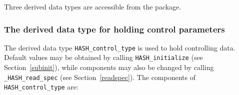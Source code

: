 \documentclass{galahad}
\newcommand{\packagename}{HASH}
\newcommand{\fullpackagename}{\libraryname\_\packagename}
\begin{document}



\galtypes
Three derived data types are accessible from the package.


\subsubsection{The derived data type for holding control
 parameters}\label{typecontrol}
The derived data type
{\tt \packagename\_control\_type}
is used to hold controlling data. Default values may be obtained by calling
{\tt \packagename\_initialize}
(see Section~\ref{subinit}),
while components may also be changed by calling
{\tt \fullpackagename\_read\-\_spec}
(see Section~\ref{readspec}).
The components of
{\tt \packagename\_control\_type}
are:
\end{document}
